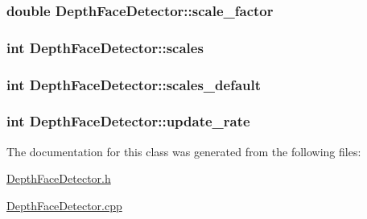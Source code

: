 \hypertarget{classDepthFaceDetector_a4dbe7bcae76b86b9dce3383e8da0fb87}{
\subsubsection[{scale\-\_\-factor}]{\setlength{\rightskip}{0pt plus 5cm}double Depth\-Face\-Detector\-::scale\-\_\-factor}}\label{classDepthFaceDetector_a4dbe7bcae76b86b9dce3383e8da0fb87}
\hypertarget{classDepthFaceDetector_ab2a61535fe93d7df87e6a37c584f9819}{
\subsubsection[{scales}]{\setlength{\rightskip}{0pt plus 5cm}int Depth\-Face\-Detector\-::scales}}\label{classDepthFaceDetector_ab2a61535fe93d7df87e6a37c584f9819}
\hypertarget{classDepthFaceDetector_a1bf21c5a6c326bba9f5710c207d1555f}{
\subsubsection[{scales\-\_\-default}]{\setlength{\rightskip}{0pt plus 5cm}int Depth\-Face\-Detector\-::scales\-\_\-default}}\label{classDepthFaceDetector_a1bf21c5a6c326bba9f5710c207d1555f}
\hypertarget{classDepthFaceDetector_ace0000695ed60a214c65e82793f53c7c}{
\subsubsection[{update\-\_\-rate}]{\setlength{\rightskip}{0pt plus 5cm}int Depth\-Face\-Detector\-::update\-\_\-rate}}\label{classDepthFaceDetector_ace0000695ed60a214c65e82793f53c7c}


The documentation for this class was generated from the following files\-:\begin{DoxyCompactItemize}
\item 
\hyperlink{DepthFaceDetector_8h}{Depth\-Face\-Detector.\-h}\item 
\hyperlink{DepthFaceDetector_8cpp}{Depth\-Face\-Detector.\-cpp}\end{DoxyCompactItemize}
